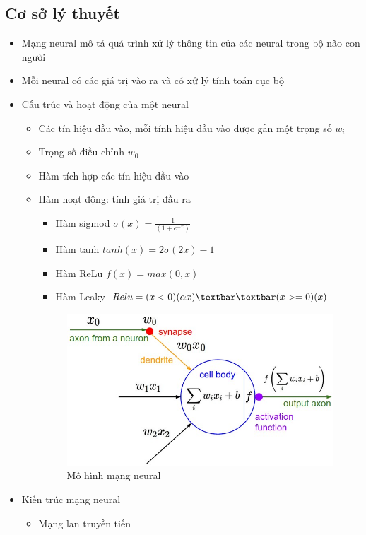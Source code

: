 \documentclass[a4paper,12pt]{report}
\begin{document}
\subsection{Cơ sở lý thuyết}
\begin{itemize}
\item Mạng neural mô tả quá trình xử lý thông tin của các neural trong bộ não con người
\item Mỗi neural có các giá trị vào ra và có xử lý tính toán cục bộ
\item Cấu trúc và hoạt động của một neural
\begin{itemize}
\item Các tín hiệu đầu vào, mỗi tính hiệu đầu vào được gắn một trọng số $w_i$
\item Trọng số điều chỉnh $w_0$
\item Hàm tích hợp các tín hiệu đầu vào
\item Hàm hoạt động: tính giá trị đầu ra
\begin{itemize}
\item Hàm sigmod $\sigma(x)= \frac{1}{(1+e^{-x})}$
\item Hàm tanh $tanh(x)=2\sigma(2x)-1$
\item Hàm ReLu $f(x)=max(0,x)$
\item Hàm Leaky $Relu=(x<0)(\alpha x)\textbar \textbar(x>=0)(x) $
\end{itemize}
\begin{figure}[H]
\centering
\includegraphics[scale=0.4]{neuron_model.jpeg}
\caption{Mô hình mạng neural}
\label{fig:splitdata}
\end{figure}
\end{itemize}
\item Kiến trúc mạng neural
\begin{itemize}
\item Mạng lan truyền tiến

\end{itemize}
\end{itemize}
\end{document}
